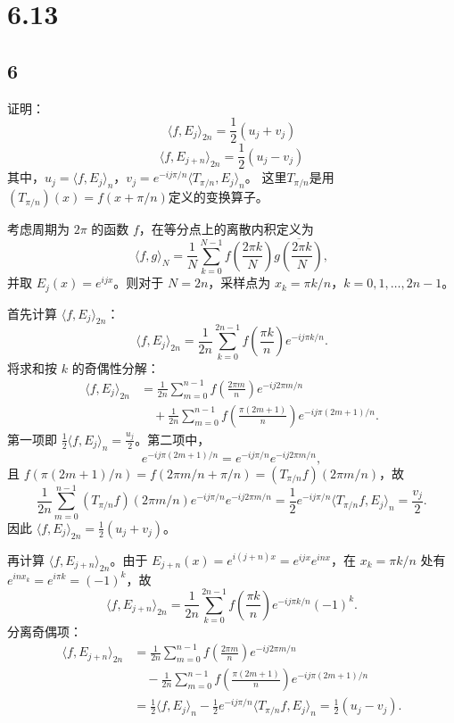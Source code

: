\documentclass{article}
\begin{document}
\section*{6.13}
\subsection*{6}

证明：
$$\langle f, E_j \rangle_{2n} = \frac{1}{2}(u_j + v_j)$$
$$\langle f, E_{j+n} \rangle_{2n} = \frac{1}{2}(u_j - v_j)$$
其中，$u_j = \langle f, E_j \rangle_n$，$v_j = e^{-ij\pi/n}\langle T_{\pi/n} , E_j \rangle_n$。
这里$T_{\pi/n}$是用$(T_{\pi/n})(x)=f(x+\pi/n)$定义的变换算子。


考虑周期为 \(2\pi\) 的函数 \(f\)，在等分点上的离散内积定义为
\[
\langle f, g \rangle_N = \frac{1}{N} \sum_{k=0}^{N-1} f\!\left( \frac{2\pi k}{N} \right) \overline{g\!\left( \frac{2\pi k}{N} \right)},
\]
并取 \(E_j(x) = e^{ijx}\)。则对于 \(N=2n\)，采样点为 \(x_k = \pi k / n\)，\(k=0,1,\dots,2n-1\)。

首先计算 \(\langle f, E_j \rangle_{2n}\)：
\[
\langle f, E_j \rangle_{2n} = \frac{1}{2n} \sum_{k=0}^{2n-1} f\!\left( \frac{\pi k}{n} \right) e^{-ij\pi k/n}.
\]
将求和按 \(k\) 的奇偶性分解：
\[
\begin{aligned}
\langle f, E_j \rangle_{2n} &= \frac{1}{2n} \sum_{m=0}^{n-1} f\!\left( \frac{2\pi m}{n} \right) e^{-ij2\pi m/n} \\
&\quad + \frac{1}{2n} \sum_{m=0}^{n-1} f\!\left( \frac{\pi(2m+1)}{n} \right) e^{-ij\pi(2m+1)/n}.
\end{aligned}
\]
第一项即 \(\frac{1}{2} \langle f, E_j \rangle_n = \frac{u_j}{2}\)。第二项中，
\[
e^{-ij\pi(2m+1)/n} = e^{-ij\pi/n} e^{-ij2\pi m/n},
\]
且 \(f(\pi(2m+1)/n) = f(2\pi m/n + \pi/n) = (T_{\pi/n}f)(2\pi m/n)\)，故
\[
\frac{1}{2n} \sum_{m=0}^{n-1} (T_{\pi/n}f)(2\pi m/n) e^{-ij\pi/n} e^{-ij2\pi m/n}
= \frac{1}{2} e^{-ij\pi/n} \langle T_{\pi/n}f, E_j \rangle_n = \frac{v_j}{2}.
\]
因此 \(\langle f, E_j \rangle_{2n} = \frac{1}{2}(u_j + v_j)\)。

再计算 \(\langle f, E_{j+n} \rangle_{2n}\)。由于 \(E_{j+n}(x)=e^{i(j+n)x}=e^{ijx}e^{inx}\)，在 \(x_k=\pi k/n\) 处有 \(e^{inx_k}=e^{i\pi k}=(-1)^k\)，故
\[
\langle f, E_{j+n} \rangle_{2n} = \frac{1}{2n} \sum_{k=0}^{2n-1} f\!\left( \frac{\pi k}{n} \right) e^{-ij\pi k/n} (-1)^k.
\]
分离奇偶项：
\[
\begin{aligned}
\langle f, E_{j+n} \rangle_{2n} &= \frac{1}{2n} \sum_{m=0}^{n-1} f\!\left( \frac{2\pi m}{n} \right) e^{-ij2\pi m/n} \\
&\quad - \frac{1}{2n} \sum_{m=0}^{n-1} f\!\left( \frac{\pi(2m+1)}{n} \right) e^{-ij\pi(2m+1)/n} \\
&= \frac{1}{2} \langle f, E_j \rangle_n - \frac{1}{2} e^{-ij\pi/n} \langle T_{\pi/n}f, E_j \rangle_n = \frac{1}{2}(u_j - v_j).
\end{aligned}
\]
\end{document}
